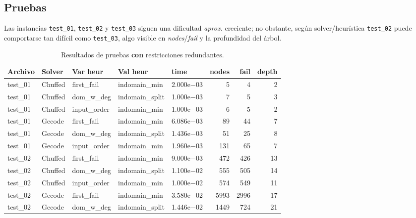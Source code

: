 
\subsection{Pruebas}\label{sec:01-sudoku-pruebas}
\noindent
\noindent
Las instancias \texttt{test\_01}, \texttt{test\_02} y \texttt{test\_03} siguen una dificultad \emph{aprox.} creciente; no obstante, según solver/heurística \texttt{test\_02} puede comportarse tan difícil como \texttt{test\_03}, algo visible en \emph{nodes}/\emph{fail} y la profundidad del árbol.

\begin{compactfloats}
\begin{table}[H]
  \centering
  \small
  \setlength{\tabcolsep}{1.8pt}
  \caption{Resultados de pruebas \textbf{con} restricciones redundantes.}
  \label{tab:pruebas-sudoku-on}
  \begin{tabular}{l l l l l r r r}
    \toprule
    \textbf{Archivo} & \textbf{Solver} & \textbf{Var heur} & \textbf{Val heur} & \textbf{time} & \textbf{nodes} & \textbf{fail} & \textbf{depth} \\
    \midrule
    test\_01 & Chuffed & first\_fail  & indomain\_min   & 2.000e$-$03 & 5    & 4    & 2 \\
    test\_01 & Chuffed & dom\_w\_deg  & indomain\_split & 1.000e$-$03 & 7    & 5    & 3 \\
    test\_01 & Chuffed & input\_order & indomain\_min   & 1.000e$-$03 & 6    & 5    & 2 \\
    test\_01 & Gecode  & first\_fail  & indomain\_min   & 6.086e$-$03 & 89   & 44   & 7 \\
    test\_01 & Gecode  & dom\_w\_deg  & indomain\_split & 1.436e$-$03 & 51   & 25   & 8 \\
    test\_01 & Gecode  & input\_order & indomain\_min   & 1.960e$-$03 & 131  & 65   & 7 \\
    \midrule
    test\_02 & Chuffed & first\_fail  & indomain\_min   & 9.000e$-$03 & 472  & 426  & 13 \\
    test\_02 & Chuffed & dom\_w\_deg  & indomain\_split & 1.100e$-$02 & 555  & 505  & 14 \\
    test\_02 & Chuffed & input\_order & indomain\_min   & 1.000e$-$02 & 574  & 549  & 11 \\
    test\_02 & Gecode  & first\_fail  & indomain\_min   & 3.580e$-$02 & 5993 & 2996 & 17 \\
    test\_02 & Gecode  & dom\_w\_deg  & indomain\_split & 1.446e$-$02 & 1449 & 724  & 21 \\

\end{tabular}
\end{table}
\end{compactfloats}
